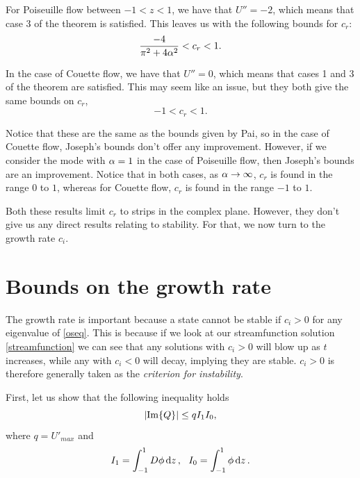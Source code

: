 For Poiseuille flow between $ -1 < z < 1 $, we have that $ U'' = -2 $, which means that case 3 of the theorem is satisfied. This leaves us with the following bounds for $ c_r $:
\begin{equation}
    \frac{-4}{\pi^2 + 4 \alpha^2} < c_r < 1.
\end{equation}

In the case of Couette flow, we have that $ U'' = 0 $, which means that cases 1 and 3 of the theorem are satisfied. This may seem like an issue, but they both give the same bounds on $ c_r$, 
\begin{equation}
    -1 < c_r < 1.
\end{equation}

Notice that these are the same as the bounds given by Pai, so in the case of Couette flow, Joseph's bounds don't offer any improvement. However, if we consider the mode with $ \alpha = 1 $ in the case of Poiseuille flow, then Joseph's bounds are an improvement. Notice that in both cases, as $ \alpha \to \infty$, $ c_r $ is found in the range $ 0 $ to $ 1 $, whereas for Couette flow, $ c_r $ is found in the range $ -1 $ to $ 1$.

Both these results limit $ c_r $ to strips in the complex plane. However, they don't give us any direct results relating to stability. For that, we now turn to the growth rate $ c_i $.

\section{Bounds on the growth rate}

The growth rate is important because a state cannot be stable if $ c_i > 0 $ for any eigenvalue of \eqref{oseq}. This is because if we look at our streamfunction solution \eqref{streamfunction} we can see that any solutions with $ c_i > 0 $ will blow up as $ t $ increases, while any with $ c_i < 0$ will decay, implying they are stable. $ c_i > 0 $ is therefore generally taken as the \emph{criterion for instability}.

First, let us show that the following inequality holds
\begin{equation}
    \abs{\Im{Q}} \leq q I_1 I_0,
\end{equation}
where $ q = U'_{max}$ and
\begin{equation}
    I_1 = \int^{1}_{-1} D \phi \dd{z},\ \ I_0 = \int^{1}_{-1} \phi \dd{z}.
\end{equation}

